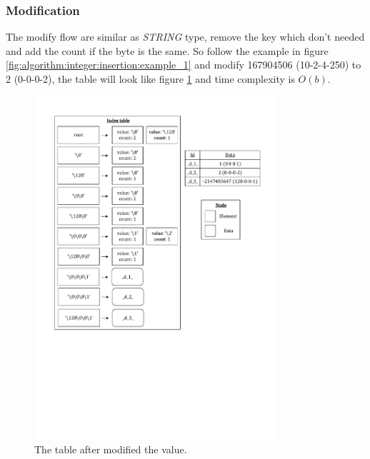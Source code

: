 \subsubsection{Modification}

The modify flow are similar as \textit{STRING} type, remove the key which don't needed and add the count if the byte is the same. So follow the example in figure \ref{fig:algorithm:integer:insertion:example_1} and modify 167904506 (10-2-4-250) to 2 (0-0-0-2), the table will look like figure \ref{fig:algorithm:integer:modification:example_1} and time complexity is $O(b)$.

\begin{figure}[h]
\centering
\includegraphics[width=0.8\textwidth]{./algorithm/integer/pic/modification/example_1_v3.pdf}
\caption{The table after modified the value.}
\label{fig:algorithm:integer:modification:example_1}
\end{figure}

